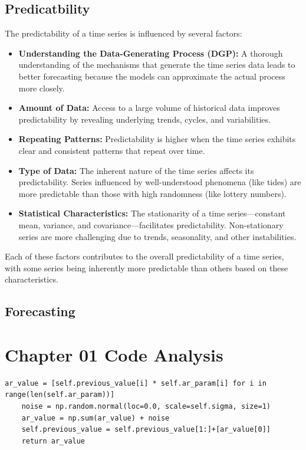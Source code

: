 \documentclass{article}
\begin{document}
\subsection{Predicatbility}
The predictability of a time series is influenced by several factors:

\begin{itemize}
  \item \textbf{Understanding the Data-Generating Process (DGP):} A thorough understanding of the mechanisms that generate the time series data leads to better forecasting because the models can approximate the actual process more closely.
  \item \textbf{Amount of Data:} Access to a large volume of historical data improves predictability by revealing underlying trends, cycles, and variabilities.
  \item \textbf{Repeating Patterns:} Predictability is higher when the time series exhibits clear and consistent patterns that repeat over time.
  \item \textbf{Type of Data:} The inherent nature of the time series affects its predictability. Series influenced by well-understood phenomena (like tides) are more predictable than those with high randomness (like lottery numbers).
  \item \textbf{Statistical Characteristics:} The stationarity of a time series—constant mean, variance, and covariance—facilitates predictability. Non-stationary series are more challenging due to trends, seasonality, and other instabilities.
\end{itemize}

Each of these factors contributes to the overall predictability of a time series, with some series being inherently more predictable than others based on these characteristics.

\subsection{Forecasting}

\section{Chapter 01 Code Analysis}

\lstset{language=Python}
\begin{lstlisting}[frame=single]
    ar_value = [self.previous_value[i] * self.ar_param[i] for i in range(len(self.ar_param))]
    noise = np.random.normal(loc=0.0, scale=self.sigma, size=1)
    ar_value = np.sum(ar_value) + noise
    self.previous_value = self.previous_value[1:]+[ar_value[0]]
    return ar_value
\end{lstlisting}
\end{document}
